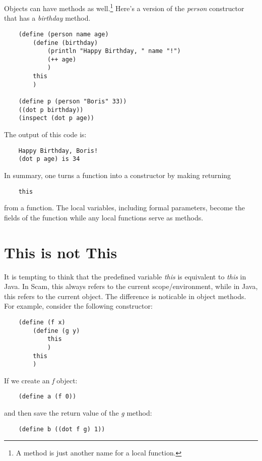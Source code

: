 Objects can have methods as well.\footnote{
A method is just another name for a local function.
}
Here's a version of the
{\it person} constructor that has a {\it birthday} method.

\begin{verbatim}
    (define (person name age)
        (define (birthday)
            (println "Happy Birthday, " name "!")
            (++ age)
            )
        this
        )
        
    (define p (person "Boris" 33))
    ((dot p birthday))
    (inspect (dot p age))
\end{verbatim}

The output of this code is:

\begin{verbatim}
    Happy Birthday, Boris!
    (dot p age) is 34
\end{verbatim}

In summary, one turns a function into a constructor by making returning

\begin{verbatim}
    this
\end{verbatim}

from a function. The local variables, including
formal parameters, become the fields of the function while
any local functions serve as methods.

\section{This is not This}

It is tempting to think that the predefined variable {\it this} is
equivalent to {\it this} in Java.
In Scam, this always refers to the current scope/environment,
while in Java, this refers to the current object. The difference
is noticable in object methods. For example, consider the following
constructor:

\begin{verbatim}
    (define (f x)
        (define (g y)
            this
            )
        this
        )
\end{verbatim}

If we create an {\it f} object:

\begin{verbatim}
    (define a (f 0))
\end{verbatim}

and then save the return value of the {\it g} method:

\begin{verbatim}
    (define b ((dot f g) 1))
\end{verbatim}
    
